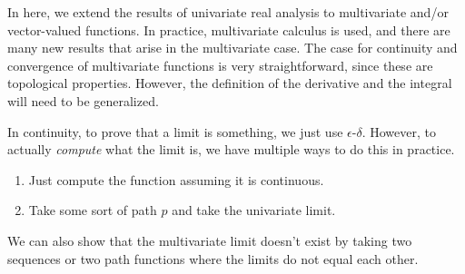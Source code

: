 In here, we extend the results of univariate real analysis to multivariate and/or vector-valued functions. In practice, multivariate calculus is used, and there are many new results that arise in the multivariate case. The case for continuity and convergence of multivariate functions is very straightforward, since these are topological properties. However, the definition of the derivative and the integral will need to be generalized. 


In continuity, to prove that a limit is something, we just use $\epsilon$-$\delta$. However, to actually \textit{compute} what the limit is, we have multiple ways to do this in practice. 
\begin{enumerate}
  \item Just compute the function assuming it is continuous. 
  \item Take some sort of path $p$ and take the univariate limit. 
\end{enumerate}

We can also show that the multivariate limit doesn't exist by taking two sequences or two path functions where the limits do not equal each other. 


